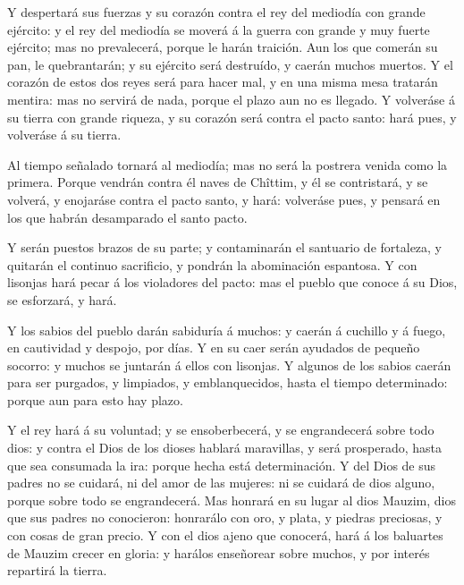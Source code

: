  Y despertará sus fuerzas y su corazón contra el rey del
mediodía con grande ejército: y el rey del mediodía se moverá á la
guerra con grande y muy fuerte ejército; mas no prevalecerá, porque le
harán traición.  Aun los que comerán su pan, le
quebrantarán; y su ejército será destruído, y caerán muchos muertos.
 Y el corazón de estos dos reyes será para hacer mal, y en
una misma mesa tratarán mentira: mas no servirá de nada, porque el plazo
aun no es llegado.  Y volveráse á su tierra con grande
riqueza, y su corazón será contra el pacto santo: hará pues, y volveráse
á su tierra.

 Al tiempo señalado tornará al mediodía; mas no será la
postrera venida como la primera.  Porque vendrán contra él
naves de Chîttim, y él se contristará, y se volverá, y enojaráse contra
el pacto santo, y hará: volveráse pues, y pensará en los que habrán
desamparado el santo pacto.

 Y serán puestos brazos de su parte; y contaminarán el
santuario de fortaleza, y quitarán el continuo sacrificio, y pondrán la
abominación espantosa.  Y con lisonjas hará pecar á los
violadores del pacto: mas el pueblo que conoce á su Dios, se esforzará,
y hará.

 Y los sabios del pueblo darán sabiduría á muchos: y caerán
á cuchillo y á fuego, en cautividad y despojo, por días.  Y
en su caer serán ayudados de pequeño socorro: y muchos se juntarán á
ellos con lisonjas.  Y algunos de los sabios caerán para
ser purgados, y limpiados, y emblanquecidos, hasta el tiempo
determinado: porque aun para esto hay plazo.

 Y el rey hará á su voluntad; y se ensoberbecerá, y se
engrandecerá sobre todo dios: y contra el Dios de los dioses hablará
maravillas, y será prosperado, hasta que sea consumada la ira: porque
hecha está determinación.  Y del Dios de sus padres no se
cuidará, ni del amor de las mujeres: ni se cuidará de dios alguno,
porque sobre todo se engrandecerá.  Mas honrará en su lugar
al dios Mauzim, dios que sus padres no conocieron: honrarálo con oro, y
plata, y piedras preciosas, y con cosas de gran precio.  Y
con el dios ajeno que conocerá, hará á los baluartes de Mauzim crecer en
gloria: y harálos enseñorear sobre muchos, y por interés repartirá la
tierra.

